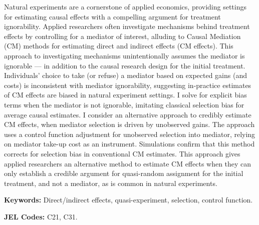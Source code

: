 \noindent
Natural experiments are a cornerstone of applied economics, providing settings for estimating causal effects with a compelling argument for treatment ignorability.
Applied researchers often investigate mechanisms behind treatment effects by controlling for a mediator of interest, alluding to Causal Mediation (CM) methods for estimating direct and indirect effects (CM effects).
This approach to investigating mechanisms unintentionally assumes the mediator is ignorable --- in addition to the causal research design for the initial treatment.
Individuals' choice to take (or refuse) a mediator based on expected gains (and costs) is inconsistent with mediator ignorability, suggesting in-practice estimates of CM effects are biased in natural experiment settings.
I solve for explicit bias terms when the mediator is not ignorable, imitating classical selection bias for average causal estimates.
I consider an alternative approach to credibly estimate CM effects, when mediator selection is driven by unobserved gains.
The approach uses a control function adjustment for unobserved selection into mediator, relying on mediator take-up cost as an instrument.
Simulations confirm that this method corrects for selection bias in conventional CM estimates.
This approach gives applied researchers an alternative method to estimate CM effects when they can only establish a credible argument for quasi-random assignment for the initial treatment, and not a mediator, as is common in natural experiments.

\vspace{0.5cm}
\noindent
\textbf{Keywords:}
Direct/indirect effects, quasi-experiment, selection, control function.

\vspace{0.1cm}
\noindent
\textbf{JEL Codes:}
C21, C31.

